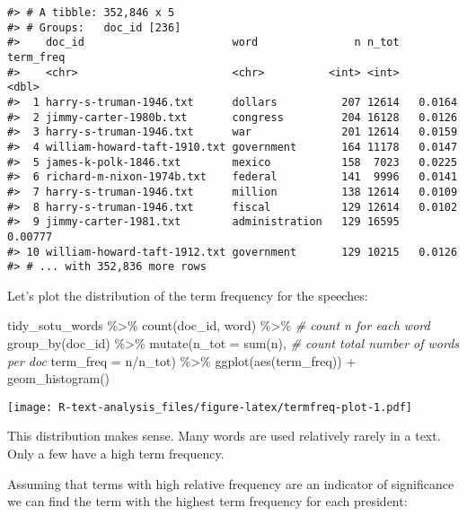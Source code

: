 \documentclass[
]{book}
\newenvironment{Shaded}{\begin{snugshade}}{\end{snugshade}}
\newcommand{\AttributeTok}[1]{\textcolor[rgb]{0.77,0.63,0.00}{#1}}
\newcommand{\CommentTok}[1]{\textcolor[rgb]{0.56,0.35,0.01}{\textit{#1}}}
\newcommand{\FunctionTok}[1]{\textcolor[rgb]{0.00,0.00,0.00}{#1}}
\newcommand{\NormalTok}[1]{#1}
\newcommand{\SpecialCharTok}[1]{\textcolor[rgb]{0.00,0.00,0.00}{#1}}
\begin{document}
\begin{verbatim}
#> # A tibble: 352,846 x 5
#> # Groups:   doc_id [236]
#>    doc_id                       word               n n_tot term_freq
#>    <chr>                        <chr>          <int> <int>     <dbl>
#>  1 harry-s-truman-1946.txt      dollars          207 12614   0.0164 
#>  2 jimmy-carter-1980b.txt       congress         204 16128   0.0126 
#>  3 harry-s-truman-1946.txt      war              201 12614   0.0159 
#>  4 william-howard-taft-1910.txt government       164 11178   0.0147 
#>  5 james-k-polk-1846.txt        mexico           158  7023   0.0225 
#>  6 richard-m-nixon-1974b.txt    federal          141  9996   0.0141 
#>  7 harry-s-truman-1946.txt      million          138 12614   0.0109 
#>  8 harry-s-truman-1946.txt      fiscal           129 12614   0.0102 
#>  9 jimmy-carter-1981.txt        administration   129 16595   0.00777
#> 10 william-howard-taft-1912.txt government       129 10215   0.0126 
#> # ... with 352,836 more rows
\end{verbatim}

Let's plot the distribution of the term frequency for the speeches:

\begin{Shaded}
\begin{Highlighting}[]
\NormalTok{tidy\_sotu\_words }\SpecialCharTok{\%\textgreater{}\%}
  \FunctionTok{count}\NormalTok{(doc\_id, word)  }\SpecialCharTok{\%\textgreater{}\%}  \CommentTok{\# count n for each word}
  \FunctionTok{group\_by}\NormalTok{(doc\_id) }\SpecialCharTok{\%\textgreater{}\%} 
  \FunctionTok{mutate}\NormalTok{(}\AttributeTok{n\_tot =} \FunctionTok{sum}\NormalTok{(n), }\CommentTok{\# count total number of words per doc}
         \AttributeTok{term\_freq =}\NormalTok{ n}\SpecialCharTok{/}\NormalTok{n\_tot) }\SpecialCharTok{\%\textgreater{}\%} 
  \FunctionTok{ggplot}\NormalTok{(}\FunctionTok{aes}\NormalTok{(term\_freq)) }\SpecialCharTok{+}
    \FunctionTok{geom\_histogram}\NormalTok{() }
\end{Highlighting}
\end{Shaded}

\texttt{[image: R-text-analysis\_files/figure-latex/termfreq-plot-1.pdf]}

This distribution makes sense. Many words are used relatively rarely in a text. Only a few have a high term frequency.

Assuming that terms with high relative frequency are an indicator of significance we can find the term with the highest term frequency for each president:
\end{document}

